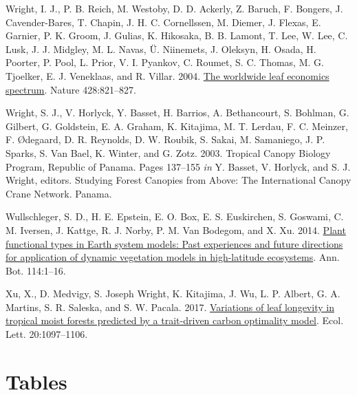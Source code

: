 \documentclass[
  12pt,
]{article}
\newlength{\cslhangindent}
\newlength{\cslentryspacingunit} %
\newenvironment{CSLReferences}[2] %
 {%
  \setlength{\parindent}{0pt}
  \ifodd #1
  \let\oldpar\par
  \def\par{\hangindent=\cslhangindent\oldpar}
  \fi
  \setlength{\parskip}{#2\cslentryspacingunit}
 }%
 {}
\begin{document}
\begin{CSLReferences}{1}{0}
\leavevmode{}%
Wright, I. J., P. B. Reich, M. Westoby, D. D. Ackerly, Z. Baruch, F. Bongers, J. Cavender-Bares, T. Chapin, J. H. C. Cornellssen, M. Diemer, J. Flexas, E. Garnier, P. K. Groom, J. Gulias, K. Hikosaka, B. B. Lamont, T. Lee, W. Lee, C. Lusk, J. J. Midgley, M. L. Navas, Ü. Niinemets, J. Oleksyn, H. Osada, H. Poorter, P. Pool, L. Prior, V. I. Pyankov, C. Roumet, S. C. Thomas, M. G. Tjoelker, E. J. Veneklaas, and R. Villar. 2004. \href{https://doi.org/10.1038/nature02403}{The worldwide leaf economics spectrum}. Nature 428:821--827.

\leavevmode{}%
Wright, S. J., V. Horlyck, Y. Basset, H. Barrios, A. Bethancourt, S. Bohlman, G. Gilbert, G. Goldstein, E. A. Graham, K. Kitajima, M. T. Lerdau, F. C. Meinzer, F. Ødegaard, D. R. Reynolds, D. W. Roubik, S. Sakai, M. Samaniego, J. P. Sparks, S. Van Bael, K. Winter, and G. Zotz. 2003. Tropical {Canopy Biology Program}, {Republic} of {Panama}. Pages 137--155 \emph{in} Y. Basset, V. Horlyck, and S. J. Wright, editors. Studying {Forest Canopies} from {Above}: {The International Canopy Crane Network}. {Panama}.

\leavevmode{}%
Wullschleger, S. D., H. E. Epstein, E. O. Box, E. S. Euskirchen, S. Goswami, C. M. Iversen, J. Kattge, R. J. Norby, P. M. Van Bodegom, and X. Xu. 2014. \href{https://doi.org/10.1093/aob/mcu077}{Plant functional types in {Earth} system models: {Past} experiences and future directions for application of dynamic vegetation models in high-latitude ecosystems}. Ann. Bot. 114:1--16.

\leavevmode{}%
Xu, X., D. Medvigy, S. Joseph Wright, K. Kitajima, J. Wu, L. P. Albert, G. A. Martins, S. R. Saleska, and S. W. Pacala. 2017. \href{https://doi.org/10.1111/ele.12804}{Variations of leaf longevity in tropical moist forests predicted by a trait-driven carbon optimality model}. Ecol. Lett. 20:1097--1106.

\end{CSLReferences}

\newpage

\hypertarget{tables}{%
\section{Tables}\label{tables}}
\end{document}
